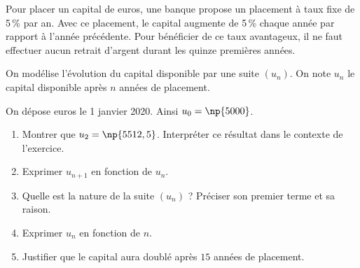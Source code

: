 \medskip

Pour placer un capital de  euros, une banque propose un placement à taux fixe de 5\,\%
par an. Avec ce placement, le capital augmente de 5\,\% chaque année par rapport à l'année
précédente. Pour bénéficier de ce taux avantageux, il ne faut effectuer aucun retrait
d'argent durant les quinze premières années.

On modélise l'évolution du capital disponible par une suite $\left(u_n\right)$. On note $u_n$ le capital
disponible après $n$ années de placement.

On dépose  euros le 1 janvier 2020. Ainsi $u_0 = \np{5000} $.

\medskip

\begin{enumerate}
\item Montrer que $u_2 = \np{5512,5}$. Interpréter ce résultat dans le contexte de l'exercice.
\item Exprimer $u_{n+1}$ en fonction de $u_n$.
\item Quelle est la nature de la suite $\left(u_n\right)$ ? Préciser son premier terme et sa raison.
\item Exprimer $u_n$ en fonction de $n$.
\item Justifier que le capital aura doublé après $15$ années de placement.
\end{enumerate}

\vspace{0,5cm}
